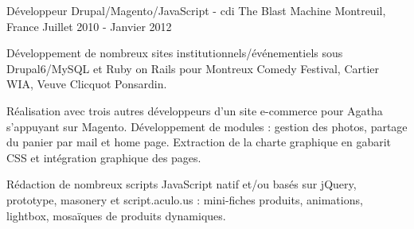 \cventry
{Développeur Drupal/Magento/JavaScript - cdi} %
{The Blast Machine} %
{Montreuil, France} %
{Juillet 2010 - Janvier 2012} %
{
\begin{cvitems} %
    \item
    {
        Développement de nombreux sites institutionnels/événementiels sous Drupal6/MySQL et Ruby on Rails pour
        Montreux Comedy Festival, Cartier WIA, Veuve Clicquot Ponsardin.
    }
    \item
    {
        Réalisation avec trois autres développeurs d'un site e-commerce pour Agatha s'appuyant sur Magento.
        Développement de modules : gestion des photos, partage du panier par mail et home page.
        Extraction de la charte graphique en gabarit CSS et intégration graphique des pages.
    }
    \item
    {
        Rédaction de nombreux scripts JavaScript natif et/ou basés sur jQuery, prototype,
        masonery et script.aculo.us : mini-fiches produits, animations, lightbox, mosaïques
        de produits dynamiques.
    }
\end{cvitems}
}
